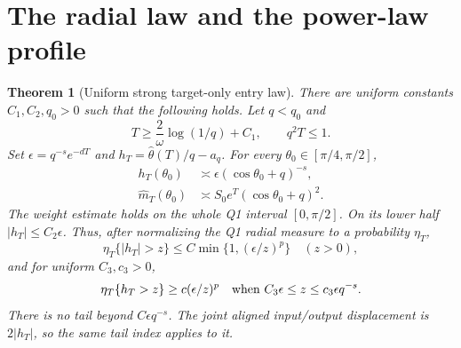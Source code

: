 \documentclass[11pt]{article}
\numberwithin{equation}{section}
\newtheorem{theorem}{Theorem}[section]\newtheorem{lemma}[theorem]{Lemma}\newtheorem{proposition}[theorem]{Proposition}\newtheorem{corollary}[theorem]{Corollary}
\theoremstyle{remark}\newtheorem{remark}[theorem]{Remark}
\begin{document}
\section{The radial law and the power-law profile}
\begin{theorem}[Uniform strong target-only entry law]\label{inc:AN02:profile:v1:entry}
There are uniform constants $C_1,C_2,q_0>0$ such that the following holds. Let $q<q_0$ and
\begin{equation}\label{inc:AN02:profile:v1:timeguard}
 T\ge\frac2\omega\log(1/q)+C_1,\qquad q^2T\le1.
\end{equation}
Set $\epsilon=q^{-s}e^{-dT}$ and $h_T=\widehat\theta(T)/q-a_q$. For every $\theta_0\in[\pi/4,\pi/2]$,
\begin{align}
 h_T(\theta_0)&\asymp \epsilon(\cos\theta_0+q)^{-s},\label{inc:AN02:profile:v1:displacement}\\
 \widehat m_T(\theta_0)&\asymp S_0e^T(\cos\theta_0+q)^2.\label{inc:AN02:profile:v1:weight}
\end{align}
The weight estimate holds on the whole Q1 interval $[0,\pi/2]$. On its lower half $|h_T|\le C_2\epsilon$. Thus, after normalizing the Q1 radial measure to a probability $\eta_T$,
\begin{equation}\label{inc:AN02:profile:v1:tailupper}
 \eta_T\{|h_T|>z\}\le C\min\{1,(\epsilon/z)^p\}\quad(z>0),
\end{equation}
and for uniform $C_3,c_3>0$,
\begin{equation}\label{inc:AN02:profile:v1:taillower}
 \eta_T\{h_T>z\}\ge c(\epsilon/z)^p
 \quad\hbox{when } C_3\epsilon\le z\le c_3\epsilon q^{-s}.
\end{equation}
There is no tail beyond $C\epsilon q^{-s}$. The joint aligned input/output displacement is $2|h_T|$, so the same tail index applies to it.
\end{theorem}
\end{document}
